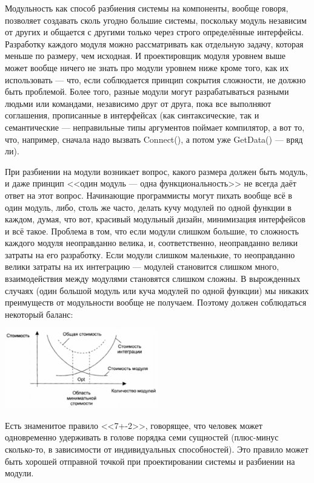 \documentclass{../../text-style}
\begin{document}
Модульность как способ разбиения системы на компоненты, вообще говоря, позволяет создавать сколь угодно большие системы, поскольку модуль независим от других и общается с другими только через строго определённые интерфейсы. Разработку каждого модуля можно рассматривать как отдельную задачу, которая меньше по размеру, чем исходная. И проектировщик модуля уровнем выше может вообще ничего не знать про модули уровнем ниже кроме того, как их использовать --- что, если соблюдается принцип сокрытия сложности, не должно быть проблемой. Более того, разные модули могут разрабатываться разными людьми или командами, независимо друг от друга, пока все выполняют соглашения, прописанные в интерфейсах (как синтаксические, так и семантические --- неправильные типы аргументов поймает компилятор, а вот то, что, например, сначала надо вызвать Connect(), а потом уже GetData() --- вряд ли).

При разбиении на модули возникает вопрос, какого размера должен быть модуль, и даже принцип <<один модуль --- одна функциональность>> не всегда даёт ответ на этот вопрос. Начинающие программисты могут пихать вообще всё в один модуль, либо, столь же часто, делать кучу модулей по одной функции в каждом, думая, что вот, красивый модульный дизайн, минимизация интерфейсов и всё такое. Проблема в том, что если модули слишком большие, то сложность каждого модуля неоправданно велика, и, соответственно, неоправданно велики затраты на его разработку. Если модули слишком маленькие, то неоправданно велики затраты на их интеграцию --- модулей становится слишком много, взаимодействия между модулями становятся слишком сложны. В вырожденных случаях (один большой модуль или куча модулей по одной функции) мы никаких преимуществ от модульности вообще не получаем. Поэтому должен соблюдаться некоторый баланс:

\begin{center}
    \includegraphics[width=0.5\textwidth]{modulesCost.png}
\end{center}

Есть знаменитое правило <<7+-2>>, говорящее, что человек может одновременно удерживать в голове порядка семи сущностей (плюс-минус сколько-то, в зависимости от индивидуальных способностей). Это правило может быть хорошей отправной точкой при проектировании системы и разбиении на модули.
\end{document}
